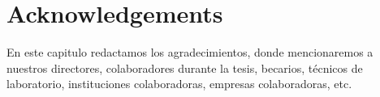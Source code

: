 %
%

\chapter*{Acknowledgements}

\noindent
En este capitulo redactamos los agradecimientos, donde mencionaremos a nuestros directores, colaboradores durante la tesis, becarios, técnicos de laboratorio, instituciones colaboradoras, empresas colaboradoras, etc.

\blindtext

\cleardoublepage %